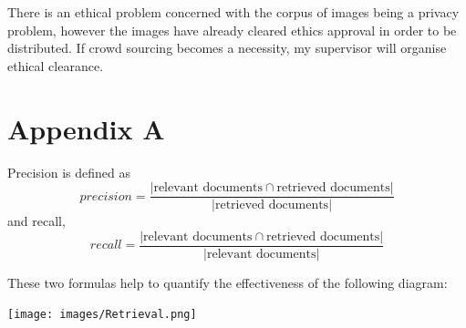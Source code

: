 \documentclass[12pt,a4paper]{article}
\begin{document}
There is an ethical problem concerned with the corpus of images being a privacy problem, however the images have already cleared ethics approval in order to be distributed. If crowd sourcing becomes a necessity, my supervisor will organise ethical clearance.



\newpage
\section{Appendix A}
Precision is defined as 
\begin{equation}
precision = \frac{| \text{relevant documents}\cap\text{retrieved documents}|}{|\text{retrieved documents}|}
\end{equation} and recall,
\begin{equation}
recall = \frac{| \text{relevant documents}\cap\text{retrieved documents}|}{|\text{relevant documents}|}
\end{equation}

These two formulas help to quantify the effectiveness of the following diagram:
\begin{center}
    \texttt{[image: images/Retrieval.png]}
\end{center}
\end{document}
